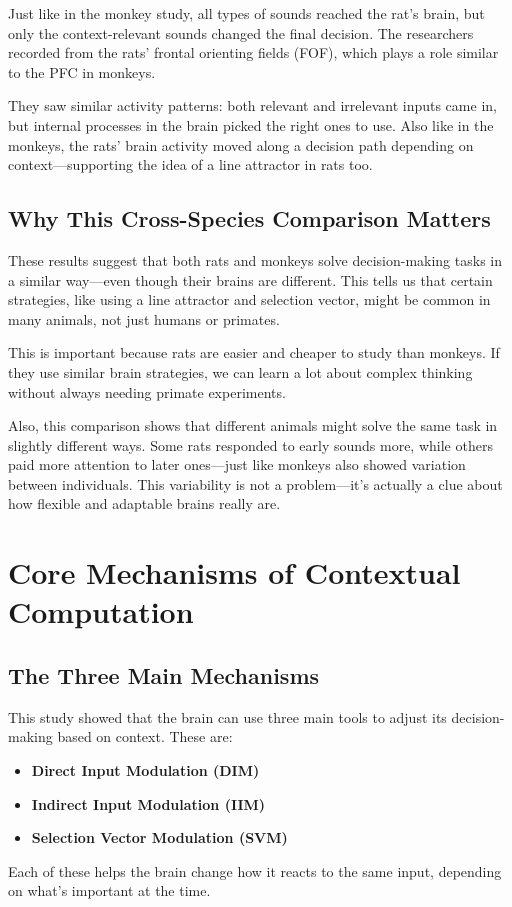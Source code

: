 \documentclass{article}
\begin{document}
Just like in the monkey study, all types of sounds reached the rat's brain, but only the context-relevant sounds changed the final decision. The researchers recorded from the rats’ frontal orienting fields (FOF), which plays a role similar to the PFC in monkeys.

They saw similar activity patterns: both relevant and irrelevant inputs came in, but internal processes in the brain picked the right ones to use. Also like in the monkeys, the rats’ brain activity moved along a decision path depending on context—supporting the idea of a line attractor in rats too.

\subsection{Why This Cross-Species Comparison Matters}
These results suggest that both rats and monkeys solve decision-making tasks in a similar way—even though their brains are different. This tells us that certain strategies, like using a line attractor and selection vector, might be common in many animals, not just humans or primates.

This is important because rats are easier and cheaper to study than monkeys. If they use similar brain strategies, we can learn a lot about complex thinking without always needing primate experiments.

Also, this comparison shows that different animals might solve the same task in slightly different ways. Some rats responded to early sounds more, while others paid more attention to later ones—just like monkeys also showed variation between individuals. This variability is not a problem—it’s actually a clue about how flexible and adaptable brains really are.


\section{Core Mechanisms of Contextual Computation}

\subsection{The Three Main Mechanisms}
This study showed that the brain can use three main tools to adjust its decision-making based on context. These are:
\begin{itemize}
\item \textbf{Direct Input Modulation (DIM)}
\item \textbf{Indirect Input Modulation (IIM)}
\item \textbf{Selection Vector Modulation (SVM)}
\end{itemize}
Each of these helps the brain change how it reacts to the same input, depending on what’s important at the time.
\end{document}
